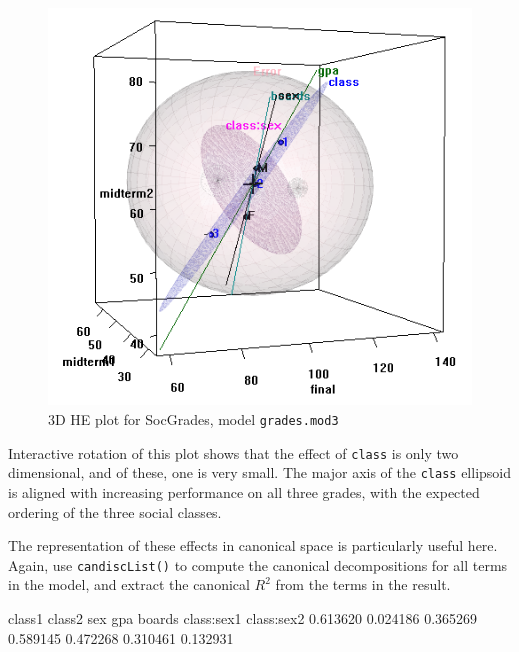 \documentclass[11pt]{article}
\newcommand{\code}[1]{{\texttt{#1}}}
\newcommand{\func}[1]{{\texttt{#1()}}}
\begin{document}
\begin{figure}[htb]
\begin{center}
	\includegraphics[width=.7\textwidth]{grades-HE3D}
\caption{3D HE plot for SocGrades, model \code{grades.mod3}}
\label{fig:grades-HE3D}
\end{center}
\end{figure}
Interactive
rotation of this plot shows that the effect of \code{class} is only two dimensional,
and of these, one is very small.  The major axis of the \code{class} ellipsoid
is aligned with increasing performance on all three grades, with the expected
ordering of the three social classes.

The representation of these effects in canonical space is particularly useful here.
Again, use \func{candiscList} to compute the canonical decompositions for all terms
in the model, and extract the canonical $R^2$ from the terms in the result.

\begin{Schunk}
\begin{Soutput}
    class1     class2        sex        gpa     boards class:sex1 class:sex2 
  0.613620   0.024186   0.365269   0.589145   0.472268   0.310461   0.132931 
\end{Soutput}
\end{Schunk}
\end{document}
